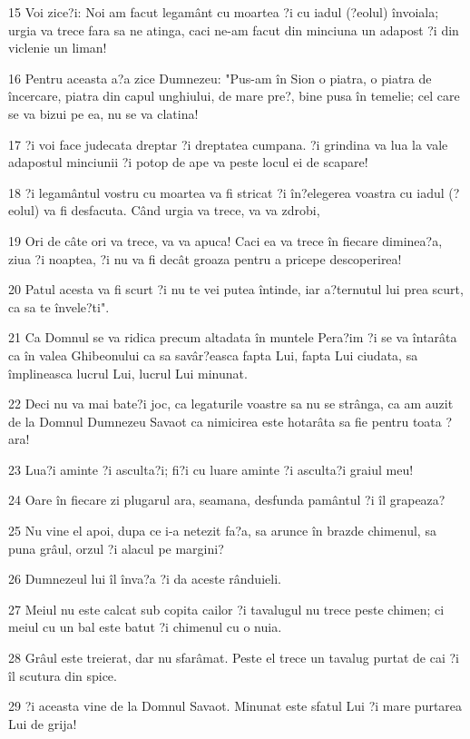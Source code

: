 \par 15 Voi zice?i: Noi am facut legamânt cu moartea ?i cu iadul (?eolul) învoiala; urgia va trece fara sa ne atinga, caci ne-am facut din minciuna un adapost ?i din viclenie un liman!
\par 16 Pentru aceasta a?a zice Dumnezeu: "Pus-am în Sion o piatra, o piatra de încercare, piatra din capul unghiului, de mare pre?, bine pusa în temelie; cel care se va bizui pe ea, nu se va clatina!
\par 17 ?i voi face judecata dreptar ?i dreptatea cumpana. ?i grindina va lua la vale adapostul minciunii ?i potop de ape va peste locul ei de scapare!
\par 18 ?i legamântul vostru cu moartea va fi stricat ?i în?elegerea voastra cu iadul (?eolul) va fi desfacuta. Când urgia va trece, va va zdrobi,
\par 19 Ori de câte ori va trece, va va apuca! Caci ea va trece în fiecare diminea?a, ziua ?i noaptea, ?i nu va fi decât groaza pentru a pricepe descoperirea!
\par 20 Patul acesta va fi scurt ?i nu te vei putea întinde, iar a?ternutul lui prea scurt, ca sa te învele?ti".
\par 21 Ca Domnul se va ridica precum altadata în muntele Pera?im ?i se va întarâta ca în valea Ghibeonului ca sa savâr?easca fapta Lui, fapta Lui ciudata, sa împlineasca lucrul Lui, lucrul Lui minunat.
\par 22 Deci nu va mai bate?i joc, ca legaturile voastre sa nu se strânga, ca am auzit de la Domnul Dumnezeu Savaot ca nimicirea este hotarâta sa fie pentru toata ?ara!
\par 23 Lua?i aminte ?i asculta?i; fi?i cu luare aminte ?i asculta?i graiul meu!
\par 24 Oare în fiecare zi plugarul ara, seamana, desfunda pamântul ?i îl grapeaza?
\par 25 Nu vine el apoi, dupa ce i-a netezit fa?a, sa arunce în brazde chimenul, sa puna grâul, orzul ?i alacul pe margini?
\par 26 Dumnezeul lui îl înva?a ?i da aceste rânduieli.
\par 27 Meiul nu este calcat sub copita cailor ?i tavalugul nu trece peste chimen; ci meiul cu un bal este batut ?i chimenul cu o nuia.
\par 28 Grâul este treierat, dar nu sfarâmat. Peste el trece un tavalug purtat de cai ?i îl scutura din spice.
\par 29 ?i aceasta vine de la Domnul Savaot. Minunat este sfatul Lui ?i mare purtarea Lui de grija!

